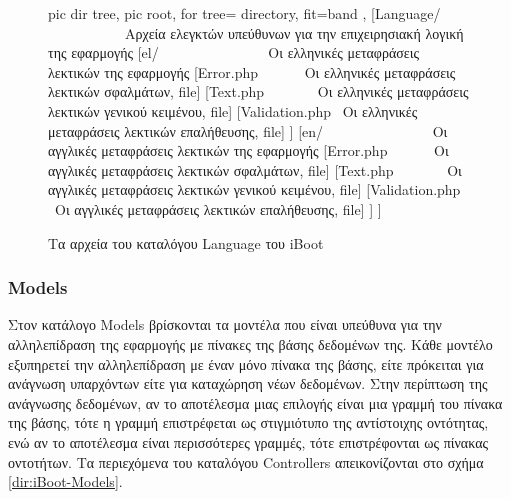 \begin{figure}
	\centering
	{\footnotesize
		\begin{forest}
			pic dir tree,
			pic root,
			for tree={%
				directory,
				fit=band
			},
			[Language/ \ \ \ \ \ \ \ \ \ \ \ Αρχεία ελεγκτών υπεύθυνων για την επιχειρησιακή λογική της εφαρμογής
				[el/ \ \ \ \ \ \ \ \ \ \ \ \ \ \ \ Οι ελληνικές μεταφράσεις λεκτικών της εφαρμογής
					[Error.php \ \ \ \ \ \ Οι ελληνικές μεταφράσεις λεκτικών σφαλμάτων, file]
					[Text.php \ \ \ \ \ \ \ Οι ελληνικές μεταφράσεις λεκτικών γενικού κειμένου, file]
					[Validation.php \ Οι ελληνικές μεταφράσεις λεκτικών επαλήθευσης, file]
				]
				[en/ \ \ \ \ \ \ \ \ \ \ \ \ \ \ \ Οι αγγλικές μεταφράσεις λεκτικών της εφαρμογής
					[Error.php \ \ \ \ \ \ Οι αγγλικές μεταφράσεις λεκτικών σφαλμάτων, file]
					[Text.php \ \ \ \ \ \ \ Οι αγγλικές μεταφράσεις λεκτικών γενικού κειμένου, file]
					[Validation.php \ Οι αγγλικές μεταφράσεις λεκτικών επαλήθευσης, file]
				]
			]
		\end{forest}
	}
	\caption{Τα αρχεία του καταλόγου Language του iBoot}
	\label{dir:iBoot-Language}
\end{figure}

\subsubsection{Models} \label{ui:app:models}
Στον κατάλογο Models βρίσκονται τα μοντέλα που είναι υπεύθυνα για την αλληλεπίδραση της εφαρμογής με πίνακες της βάσης δεδομένων της. Κάθε μοντέλο εξυπηρετεί την αλληλεπίδραση με έναν μόνο πίνακα της βάσης, είτε πρόκειται για ανάγνωση υπαρχόντων είτε για καταχώρηση νέων δεδομένων. Στην περίπτωση της ανάγνωσης δεδομένων, αν το αποτέλεσμα μιας επιλογής είναι μια γραμμή του πίνακα της βάσης, τότε η γραμμή επιστρέφεται ως στιγμιότυπο της αντίστοιχης οντότητας, ενώ αν το αποτέλεσμα είναι περισσότερες γραμμές, τότε επιστρέφονται ως πίνακας οντοτήτων. Τα περιεχόμενα του καταλόγου Controllers απεικονίζονται στο σχήμα \ref{dir:iBoot-Models}.

